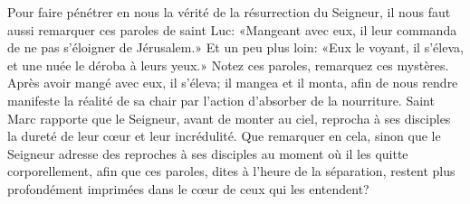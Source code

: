 Pour faire pénétrer en nous la vérité de la résurrection du Seigneur,
	il nous faut aussi remarquer ces paroles de saint Luc:
	«Mangeant avec eux, il leur commanda de ne pas s’éloigner de Jérusalem.»
Et un peu plus loin:
	«Eux le voyant, il s’éleva, et une nuée le déroba à leurs yeux.»
	Notez ces paroles, remarquez ces mystères.
Après avoir mangé avec eux, il s’éleva;
	il mangea et il monta, afin de nous rendre manifeste la réalité de sa chair
	par l’action d’absorber de la nourriture.
Saint Marc rapporte que le Seigneur, avant de monter au ciel,
	reprocha à ses disciples la dureté de leur cœur et leur incrédulité.
Que remarquer en cela,
	sinon que le Seigneur adresse des reproches à ses disciples
	au moment où il les quitte corporellement,
	afin que ces paroles, dites à l’heure de la séparation,
	restent plus profondément imprimées
		dans le cœur de ceux qui les entendent?
